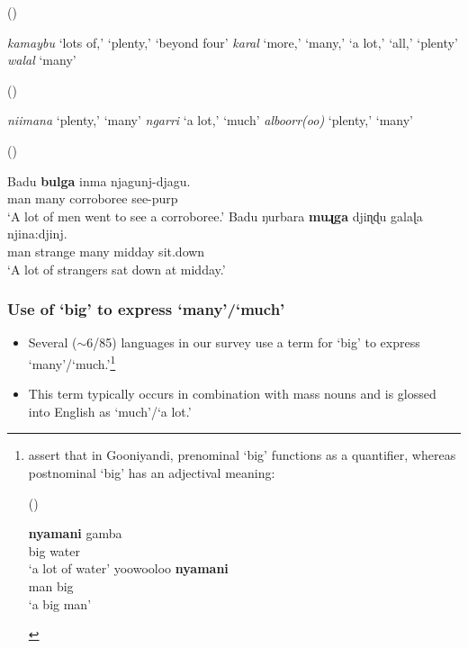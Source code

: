 \documentclass{article}
\makeatletter
\newcommand{\ofy}{/85} %
\makeatother
\begin{document}
\begin{exe}
 (\citealt{sharpe98})
\begin{xlist}
\ex \textit{kamaybu} `lots of,' `plenty,' `beyond four'
\ex \textit{karal} `more,' `many,' `a lot,' `all,' `plenty'
\ex \textit{walal}  `many' 
\end{xlist} 
 (\citealt{bowern12}) 
\begin{xlist}
\ex \textit{niimana}  `plenty,' `many'
\ex \textit{ngarri} `a lot,' `much'
\ex \textit{alboorr(oo)} `plenty,' `many'
\end{xlist} 
 (\citealt[32, 57]{platt72})
\begin{xlist}
\ex  \gll Badu \textbf{bulga} inma         njagunj-djagu.\\
man many corroboree see-{\sc purp}\\
\glt `A lot of men went to see a corroboree.' %
\ex  \gll Badu ŋurbara \textbf{muɻga} djiɳɖu galaɭa njina:djinj.\\
man  strange  many  midday  sit.down\\
\glt `A lot of strangers sat down at midday.' 
\end{xlist}
\end{exe}

\subsubsection{Use of `big' to express `many'/`much' \label{bigmanysection}}


\begin{itemize}
    \item Several ($\sim$6\ofy) languages in our survey use a term for `big' to express `many'/`much.'\footnote{\citet[37]{louagieverstraete16} assert that in Gooniyandi, prenominal `big' functions as a quantifier, whereas postnominal `big' has an adjectival meaning:
    \vspace{-2mm}
    \begin{exe}
     (\citealt[260,265]{mcgregor90})
    \begin{xlist}
    \ex \gll \textbf{nyamani} gamba\\
big water \\
\glt `a lot of water'%
\ex \gll yoowooloo \textbf{nyamani} \\
man big \\
\glt `a big man' %
    \end{xlist}
    \end{exe}
    }
    \item This term typically occurs in combination with mass nouns and is glossed into English as `much'/`a lot.'
\end{itemize}
\end{document}
